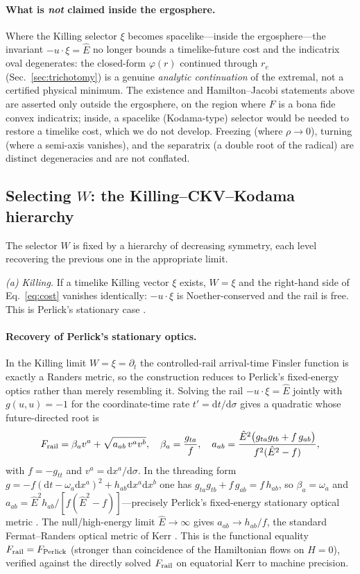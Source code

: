 \documentclass[12pt]{iopart}
\newcommand{\Ehat}{\hat E}
\newcommand{\re}{r_{e}}
\newcommand{\dd}{\mathrm{d}}
\begin{document}
\paragraph{What is \emph{not} claimed inside the ergosphere.} Where the Killing
selector $\xi$ becomes spacelike---inside the ergosphere---the invariant
$-u\cdot\xi=\Ehat$ no longer bounds a timelike-future cost and the indicatrix oval
degenerates: the closed-form $\varphi(r)$ continued through $\re$
(Sec.~\ref{sec:trichotomy}) is a genuine \emph{analytic continuation} of the
extremal, not a certified physical minimum. The existence and Hamilton--Jacobi
statements above are asserted only outside the ergosphere, on the region where $F$
is a bona fide convex indicatrix; inside, a spacelike (Kodama-type) selector would
be needed to restore a timelike cost, which we do not develop. Freezing (where
$\rho\to0$), turning (where a semi-axis vanishes), and the separatrix (a double
root of the radical) are distinct degeneracies and are not conflated.

\subsection{Selecting $W$: the Killing--CKV--Kodama hierarchy}
\label{sec:whierarchy}
The selector $W$ is fixed by a hierarchy of decreasing symmetry, each level
recovering the previous one in the appropriate limit.

\emph{(a) Killing.} If a timelike Killing vector $\xi$ exists, $W=\xi$ and the
right-hand side of Eq.~\eqref{eq:cost} vanishes identically: $-u\cdot\xi$ is
Noether-conserved and the rail is free. This is Perlick's stationary case
\cite{Perlick1991}.

\paragraph{Recovery of Perlick's stationary optics.} In the Killing limit
$W=\xi=\partial_t$ the controlled-rail arrival-time Finsler function is exactly a
Randers metric, so the construction reduces to Perlick's fixed-energy optics rather
than merely resembling it. Solving the rail $-u\cdot\xi=\Ehat$ jointly with
$g(u,u)=-1$ for the coordinate-time rate $t'=\dd t/\dd\sigma$ gives a quadratic whose
future-directed root is
\begin{equation}
F_{\rm rail}=\beta_a v^a+\sqrt{a_{ab}\,v^a v^b},\quad
\beta_a=\frac{g_{ta}}{f},\quad
a_{ab}=\frac{\Ehat^2\bigl(g_{ta}g_{tb}+f\,g_{ab}\bigr)}{f^2(\Ehat^2-f)},
\label{eq:perlick-randers}
\end{equation}
with $f=-g_{tt}$ and $v^a=\dd x^a/\dd\sigma$. In the threading form
$g=-f(\dd t-\omega_a\dd x^a)^2+h_{ab}\dd x^a\dd x^b$ one has
$g_{ta}g_{tb}+f\,g_{ab}=f\,h_{ab}$, so $\beta_a=\omega_a$ and
$a_{ab}=\Ehat^2 h_{ab}/[f(\Ehat^2-f)]$---precisely Perlick's fixed-energy stationary
optical metric \cite{Perlick1991}. The null/high-energy limit $\Ehat\to\infty$ gives
$a_{ab}\to h_{ab}/f$, the standard Fermat--Randers optical metric of Kerr
\cite{GibbonsWerner2008}. This is the functional equality $F_{\rm rail}=F_{\rm Perlick}$
(stronger than coincidence of the Hamiltonian flows on $H=0$), verified against the
directly solved $F_{\rm rail}$ on equatorial Kerr to machine precision.
\end{document}
